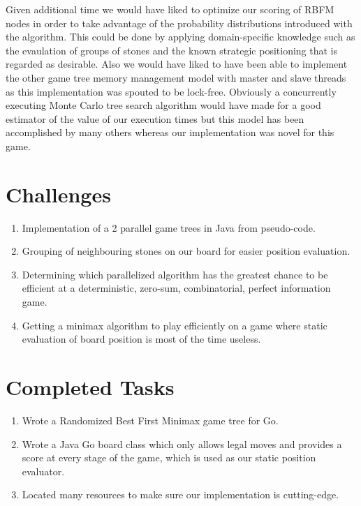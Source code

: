 \documentclass[conference]{IEEEtran}
\begin{document}
Given additional time we would have liked to optimize our scoring of RBFM nodes in order to take advantage of the probability distributions introduced with the algorithm. This could be done by applying domain-specific knowledge such as the evaulation of groups of stones and the known strategic positioning that is regarded as desirable. Also we would have liked to have been able to implement the other game tree memory management model with master and slave threads as this implementation was spouted to be lock-free. Obviously a concurrently executing Monte Carlo tree search algorithm would have made for a good estimator of the value of our execution times but this model has been accomplished by many others whereas our implementation was novel for this game.

\appendices
\section{Challenges}
\begin{enumerate}
  \item Implementation of a 2 parallel game trees in Java from pseudo-code.
  \item Grouping of neighbouring stones on our board for easier position evaluation.
  \item Determining which parallelized algorithm has the greatest chance to be efficient at a deterministic, zero-sum, combinatorial, perfect information game.
  \item Getting a minimax algorithm to play efficiently on a game where static evaluation of board position is most of the time useless.
\end{enumerate}

\section{Completed Tasks}
\begin{enumerate}
  \item Wrote a Randomized Best First Minimax game tree for Go.
  \item Wrote a Java Go board class which only allows legal moves and provides a score at every stage of the game, which is used as our static position evaluator.
  \item Located many resources to make sure our implementation is cutting-edge.
\end{enumerate}
\end{document}
